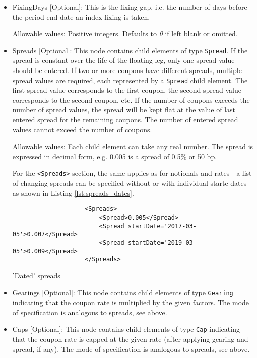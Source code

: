 \begin{itemize}
\item FixingDays [Optional]: This is the fixing gap, i.e. the number of days
  before the period end date an index fixing is taken.   

Allowable values:  Positive integers.  Defaults to \emph{0} if left blank or omitted.

\item Spreads [Optional]: This node contains child elements of type
  \lstinline!Spread!. If the spread is constant over the life of the
  floating leg, only one spread value should be entered. If two or more
  coupons have different spreads, multiple spread values are required,
  each represented by a \lstinline!Spread! child element. The first
  spread value corresponds to the first coupon, the second spread
  value corresponds to the second coupon, etc. If the number of
  coupons exceeds the number of spread values, the spread will be kept
  flat at the value of last entered spread for the remaining coupons.
  The number of entered spread values cannot exceed the number of
  coupons. 

  Allowable values: Each child element can take any real number. The spread is expressed in decimal form, e.g. 0.005 is
  a spread of 0.5\% or 50 bp.

For the {\tt <Spreads>} section, the same applies as for notionals and
rates - a list of changing spreads can be specified without or with individual starte dates as shown
in Listing \ref{lst:spreads_dates}.
\begin{listing}[H]
\begin{verbatim}
                    <Spreads>
                        <Spread>0.005</Spread>
                        <Spread startDate='2017-03-05'>0.007</Spread>
                        <Spread startDate='2019-03-05'>0.009</Spread>
                    </Spreads>
\end{verbatim}
\caption{'Dated' spreads}
\label{lst:spreads_dates}
\end{listing}

\item Gearings [Optional]: This node contains child elements of type \lstinline!Gearing! indicating that the coupon rate is
  multiplied by the given factors. The mode of specification is analogous to spreads, see above.

\item Caps [Optional]: This node contains child elements of type \lstinline!Cap! indicating that the coupon rate is capped at the
  given rate (after applying gearing and spread, if any). The mode of specification is analogous to spreads, see above.


\end{itemize}
